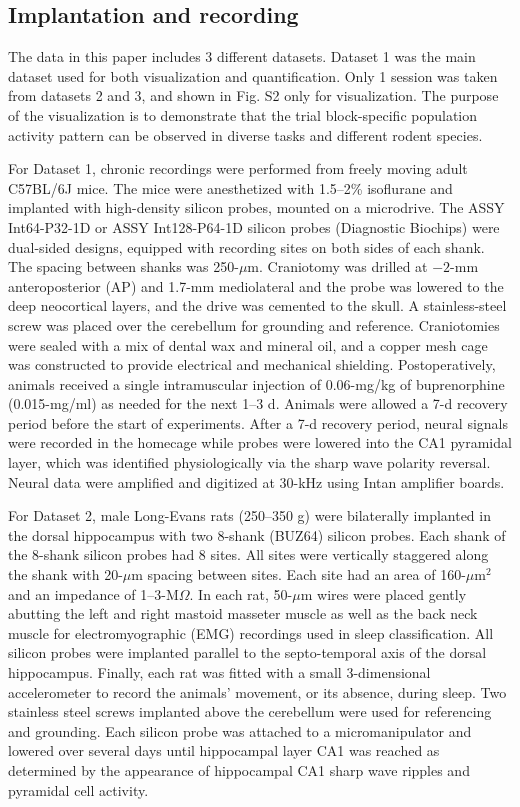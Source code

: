 \subsection{Implantation and recording}

The data in this paper includes 3 different datasets. Dataset 1 was the main dataset used for both visualization and quantification. Only 1 session was taken from datasets 2 and 3, and shown in Fig. S2 only for visualization. The purpose of the visualization is to demonstrate that the trial block-specific population activity pattern can be observed in diverse tasks and different rodent species.

For Dataset 1, chronic recordings were performed from freely moving adult C57BL/6J mice. The mice were anesthetized with 1.5--2\% isoflurane and implanted with high-density silicon probes, mounted on a microdrive. The ASSY Int64-P32-1D or ASSY Int128-P64-1D silicon probes (Diagnostic Biochips) were dual-sided designs, equipped with recording sites on both sides of each shank. The spacing between shanks was 250-$\mu$m. Craniotomy was drilled at $-2$-mm anteroposterior (AP) and 1.7-mm mediolateral and the probe was lowered to the deep neocortical layers, and the drive was cemented to the skull. A stainless-steel screw was placed over the cerebellum for grounding and reference. Craniotomies were sealed with a mix of dental wax and mineral oil, and a copper mesh cage was constructed to provide electrical and mechanical shielding. Postoperatively, animals received a single intramuscular injection of 0.06-mg/kg of buprenorphine (0.015-mg/ml) as needed for the next 1--3 d. Animals were allowed a 7-d recovery period before the start of experiments. After a 7-d recovery period, neural signals were recorded in the homecage while probes were lowered into the CA1 pyramidal layer, which was identified physiologically via the sharp wave polarity reversal. Neural data were amplified and digitized at 30-kHz using Intan amplifier boards.

For Dataset 2, male Long-Evans rats (250--350 g) were bilaterally implanted in the dorsal hippocampus with two 8-shank (BUZ64) silicon probes. Each shank of the 8-shank silicon probes had 8 sites. All sites were vertically staggered along the shank with 20-$\mu$m spacing between sites. Each site had an area of 160-$\mu$m$^2$ and an impedance of 1--3-M$\Omega$. In each rat, 50-$\mu$m wires were placed gently abutting the left and right mastoid masseter muscle as well as the back neck muscle for electromyographic (EMG) recordings used in sleep classification. All silicon probes were implanted parallel to the septo-temporal axis of the dorsal hippocampus. Finally, each rat was fitted with a small 3-dimensional accelerometer to record the animals' movement, or its absence, during sleep. Two stainless steel screws implanted above the cerebellum were used for referencing and grounding. Each silicon probe was attached to a micromanipulator and lowered over several days until hippocampal layer CA1 was reached as determined by the appearance of hippocampal CA1 sharp wave ripples and pyramidal cell activity.

